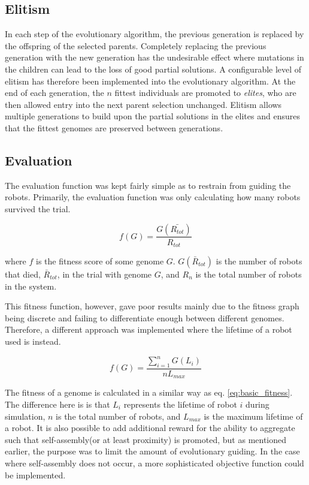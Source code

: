 \subsection{Elitism}
In each step of the evolutionary algorithm, the previous generation is replaced by the offspring of the selected parents.
Completely replacing the previous generation with the new generation has the undesirable effect where mutations in the children can lead to the loss of good partial solutions.
A configurable level of elitism has therefore been implemented into the evolutionary algorithm.
At the end of each generation, the $n$ fittest individuals are promoted to \emph{elites}, who are then allowed entry into the next parent selection unchanged.
Elitism allows multiple generations to build upon the partial solutions in the elites and ensures that the fittest genomes are preserved between generations.

\subsection{Evaluation}
\label{sec:evaluation}
The evaluation function was kept fairly simple as to restrain from guiding the robots.
Primarily, the evaluation function was only calculating how many robots survived the trial.

\begin{equation}
\label{eq:basic_fitness}
f(G) = \frac{G(\bar{R_{tot}})}{R_{tot}}
\end{equation}

where $f$ is the fitness score of some genome $G$.
$G(\bar{R}_{tot})$ is the number of robots that died, $\bar{R}_{tot}$, in the trial with genome $G$, and $R_n$ is the total number of robots in the system.

This fitness function, however, gave poor results mainly due to the fitness graph being discrete and failing to differentiate enough between different genomes.
Therefore, a different approach was implemented where the lifetime of a robot used is instead.

\begin{equation}
f(G) = \frac{\sum_{i=1}^n G(L_i)}{nL_{max}}
\end{equation}

The fitness of a genome is calculated in a similar way as eq. \ref{eq:basic_fitness}.
The difference here is is that $L_i$ represents the lifetime of robot $i$ during simulation, $n$ is the total number of robots, and $L_{max}$ is the maximum lifetime of a robot.
It is also possible to add additional reward for the ability to aggregate such that self-assembly(or at least proximity) is promoted, but as mentioned earlier, the purpose was to limit the amount of evolutionary guiding.
In the case where self-assembly does not occur, a more sophisticated objective function could be implemented.
		
